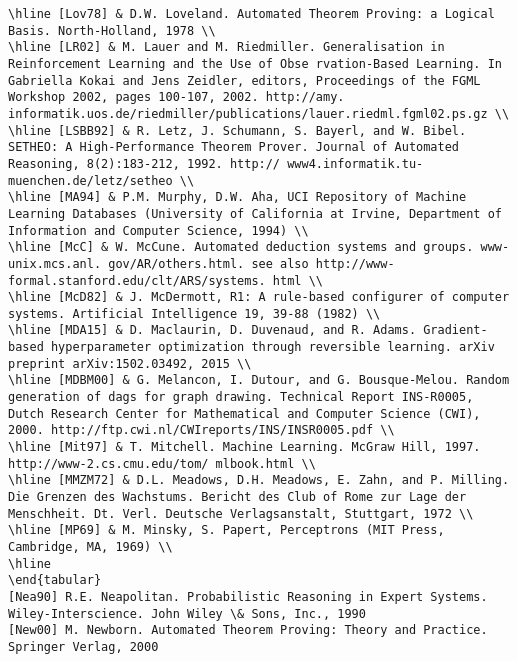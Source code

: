 \documentclass[10pt]{article}
\begin{document}
\begin{verbatim}
\hline [Lov78] & D.W. Loveland. Automated Theorem Proving: a Logical Basis. North-Holland, 1978 \\
\hline [LR02] & M. Lauer and M. Riedmiller. Generalisation in Reinforcement Learning and the Use of Obse rvation-Based Learning. In Gabriella Kokai and Jens Zeidler, editors, Proceedings of the FGML Workshop 2002, pages 100-107, 2002. http://amy. informatik.uos.de/riedmiller/publications/lauer.riedml.fgml02.ps.gz \\
\hline [LSBB92] & R. Letz, J. Schumann, S. Bayerl, and W. Bibel. SETHEO: A High-Performance Theorem Prover. Journal of Automated Reasoning, 8(2):183-212, 1992. http:// www4.informatik.tu-muenchen.de/letz/setheo \\
\hline [MA94] & P.M. Murphy, D.W. Aha, UCI Repository of Machine Learning Databases (University of California at Irvine, Department of Information and Computer Science, 1994) \\
\hline [McC] & W. McCune. Automated deduction systems and groups. www-unix.mcs.anl. gov/AR/others.html. see also http://www-formal.stanford.edu/clt/ARS/systems. html \\
\hline [McD82] & J. McDermott, R1: A rule-based configurer of computer systems. Artificial Intelligence 19, 39-88 (1982) \\
\hline [MDA15] & D. Maclaurin, D. Duvenaud, and R. Adams. Gradient-based hyperparameter optimization through reversible learning. arXiv preprint arXiv:1502.03492, 2015 \\
\hline [MDBM00] & G. Melancon, I. Dutour, and G. Bousque-Melou. Random generation of dags for graph drawing. Technical Report INS-R0005, Dutch Research Center for Mathematical and Computer Science (CWI), 2000. http://ftp.cwi.nl/CWIreports/INS/INSR0005.pdf \\
\hline [Mit97] & T. Mitchell. Machine Learning. McGraw Hill, 1997. http://www-2.cs.cmu.edu/tom/ mlbook.html \\
\hline [MMZM72] & D.L. Meadows, D.H. Meadows, E. Zahn, and P. Milling. Die Grenzen des Wachstums. Bericht des Club of Rome zur Lage der Menschheit. Dt. Verl. Deutsche Verlagsanstalt, Stuttgart, 1972 \\
\hline [MP69] & M. Minsky, S. Papert, Perceptrons (MIT Press, Cambridge, MA, 1969) \\
\hline
\end{tabular}
[Nea90] R.E. Neapolitan. Probabilistic Reasoning in Expert Systems. Wiley-Interscience. John Wiley \& Sons, Inc., 1990
[New00] M. Newborn. Automated Theorem Proving: Theory and Practice. Springer Verlag, 2000

\end{verbatim}
\end{document}
